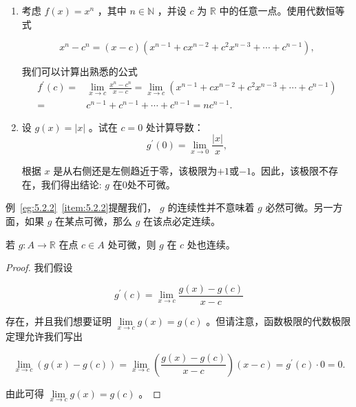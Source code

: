 \begin{Eg}\label{eg:5.2.2}
  \begin{enumerate}[label = (\alph*)]
  \item\label{item:5.2.1} 考虑 \(f\left( x\right)  = {x}^{n}\) ，其中 \(n \in  \mathbb{N}\) ，并设 \(c\) 为 \(\mathbb{R}\) 中的任意一点。使用代数恒等式

\[
{x}^{n} - {c}^{n} = \left( {x - c}\right) \left( {{x}^{n - 1} + c{x}^{n - 2} + {c}^{2}{x}^{n - 3} + \cdots  + {c}^{n - 1}}\right) ,
\]

我们可以计算出熟悉的公式
\begin{align*}
{f}^{\prime }\left( c\right)  = & \mathop{\lim }\limits_{{x \rightarrow  c}}\frac{{x}^{n} - {c}^{n}}{x - c} = \mathop{\lim }\limits_{{x \rightarrow  c}}\left( {{x}^{n - 1} + c{x}^{n - 2} + {c}^{2}{x}^{n - 3} + \cdots  + {c}^{n - 1}}\right)\\
= & {c}^{n - 1} + {c}^{n - 1} + \cdots  + {c}^{n - 1} = n{c}^{n - 1}.
\end{align*}

\item \label{item:5.2.2}
设 \(g\left( x\right)  = \left| x\right|\) 。试在 \(c = 0\) 处计算导数：
\[
{g}^{\prime }\left( 0\right)  = \mathop{\lim }\limits_{{x \rightarrow  0}}\frac{\left| x\right| }{x},
\]

根据 \(x\) 是从右侧还是左侧趋近于零，该极限为$+1$或$-1$。因此，该极限不存在，我们得出结论: \(g\) 在$0$处不可微。
  \end{enumerate}
\end{Eg}
 
例~\ref{eg:5.2.2}~\ref{item:5.2.2}提醒我们， \(g\) 的连续性并不意味着 \(g\) 必然可微。另一方面，如果 \(g\) 在某点可微，那么 \(g\) 在该点必定连续。

\begin{Def}\label{def:5.2.3}
  若 \(g : A \rightarrow  \mathbb{R}\) 在点 \(c \in  A\) 处可微，则 \(g\) 在 \(c\) 处也连续。
\end{Def}

\begin{proof}
我们假设

\[
{g}^{\prime }\left( c\right)  = \mathop{\lim }\limits_{{x \rightarrow  c}}\frac{g\left( x\right)  - g\left( c\right) }{x - c}
\]

存在，并且我们想要证明 \(\mathop{\lim }\limits_{{x \rightarrow  c}}g\left( x\right)  = g\left( c\right)\) 。但请注意，函数极限的代数极限定理允许我们写出

\[
\mathop{\lim }\limits_{{x \rightarrow  c}}\left( {g\left( x\right)  - g\left( c\right) }\right)  = \mathop{\lim }\limits_{{x \rightarrow  c}}\left( \frac{g\left( x\right)  - g\left( c\right) }{x - c}\right) \left( {x - c}\right)  = {g}^{\prime }\left( c\right)  \cdot  0 = 0.
\]

由此可得 \(\mathop{\lim }\limits_{{x \rightarrow  c}}g\left( x\right)  = g\left( c\right)\) 。  
\end{proof}

